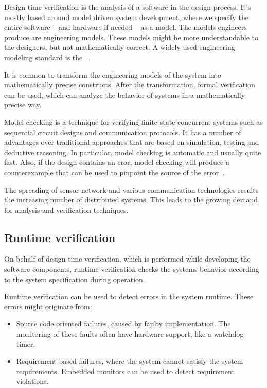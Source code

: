 Design time verification is the analysis of a software in the design process. It's mostly based around model driven system development, where we specify the entire software\,---and hardware if needed---\,as a model.
The models engineers produce are engineering models. These models might be more understandable to the designers, but not mathematically correct. A widely used engineering modeling standard is the \uml{}~\cite{UML}.

It is common to transform the engineering models of the system into mathematically precise constructs. After the transformation, formal verification can be used, which can analyze the behavior of systems in a mathematically precise way.

Model checking is a technique for verifying finite-state concurrent systems such as sequential circuit designs and communication protocols. It has a number of advantages over traditional approaches that are based on simulation, testing and deductive reasoning. In particular, model checking is automatic and usually quite fast. Also, if the design contains an eror, model checking will produce a counterexample that can be used to pinpoint the source of the error~\cite{mcmillan1993symbolic}.

The spreading of sensor network and various communication technologies results the increasing number of distributed systems. This leads to the growing demand for analysis and verification techniques.

\subsection{Runtime verification}

On behalf of design time verification, which is performed while developing the software components, runtime verification checks the systems behavior according to the system specification during operation.

Runtime verification can be used to detect errors in the system runtime. These errors might originate from:
\begin{itemize}
	\item Source code oriented failures, caused by faulty implementation. The monitoring of these faults often have hardware support, like a watchdog timer.
	\item Requirement based failures, where the system cannot satisfy the system requirements. Embedded monitors can be used to detect requirement violations.
\end{itemize}

